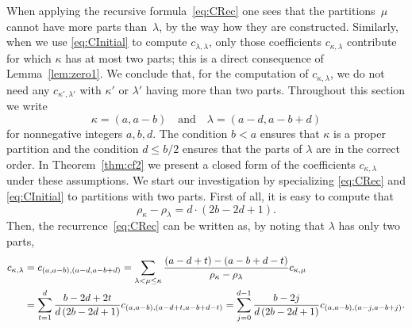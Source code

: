 \documentclass{mathincs}
\numberwithin{equation}{section}
\numberwithin{figure}{section}
\theoremstyle{plain}
\theoremstyle{definition}
\theoremstyle{remark}
\theoremstyle{plain}
\theoremstyle{definition}
\theoremstyle{plain}
\theoremstyle{plain}
\begin{document}
When applying the recursive formula~\eqref{eq:CRec} one sees that the
partitions~$\mu$ cannot have more parts than~$\lambda$, by the way how they
are constructed. Similarly, when we use \eqref{eq:CInitial} to compute
$c_{\lambda,\lambda}$, only those coefficients $c_{\kappa,\lambda}$ contribute
for which $\kappa$ has at most two parts; this is a direct consequence of
Lemma~\ref{lem:zero1}.  We conclude that, for the computation of
$c_{\kappa,\lambda}$, we do not need any $c_{\kappa',\lambda'}$ with $\kappa'$
or $\lambda'$ having more than two parts.  Throughout this section we write
\[
  \kappa=(a,a-b) \quad\text{and}\quad \lambda=(a-d,a-b+d)
\]
for nonnegative integers $a,b,d$.  The condition $b<a$ ensures that $\kappa$
is a proper partition and the condition $d\leq b/2$ ensures that the
parts of $\lambda$ are in the correct order. In Theorem~\ref{thm:cf2} we
present a closed form of the coefficients $c_{\kappa,\lambda}$ under these
assumptions. We start our investigation by specializing
 \eqref{eq:CRec} and \eqref{eq:CInitial} to partitions with two
parts. First of all, it is easy to compute that 
\[
  \rho_{\kappa}-\rho_{\lambda} = d\cdot(2b-2d+1).
\]
Then, the recurrence~\eqref{eq:CRec} can be written as, by noting that
$\lambda$ has only two parts,
\begin{align}\label{eq:rec2}
  c_{\kappa,\lambda} &= c_{(a,a-b),(a-d,a-b+d)} =
  \sum_{\lambda<\mu\leq\kappa}\frac{(a-d+t)-(a-b+d-t)}{\rho_{\kappa}-\rho_{\lambda}} c_{\kappa,\mu} \\
  &= \sum_{t=1}^d\frac{b-2d+2t}{d\,(2b-2d+1)}c_{(a,a-b),(a-d+t,a-b+d-t)} 
  = \sum_{j=0}^{d-1} \frac{b-2j}{d\,(2b-2d+1)}c_{(a,a-b),(a-j,a-b+j)}. \notag
\end{align}
\end{document}
